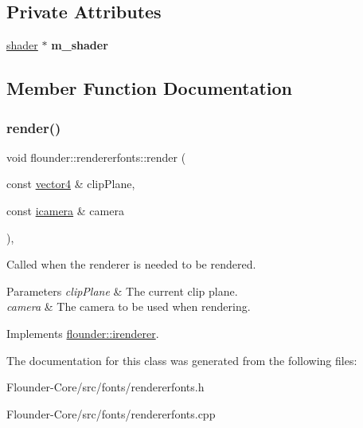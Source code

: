 \subsection*{Private Attributes}
\begin{DoxyCompactItemize}
\item 
\mbox{\label{classflounder_1_1rendererfonts_a3fd94919ff2c493737089b6cd6d80884}} 
\hyperlink{classflounder_1_1shader}{shader} $\ast$ {\bfseries m\+\_\+shader}
\end{DoxyCompactItemize}


\subsection{Member Function Documentation}
\mbox{\label{classflounder_1_1rendererfonts_a7702e992c6546d06019ce2ef1bf68c33}} 
\subsubsection{\texorpdfstring{render()}{render()}}
{\footnotesize\ttfamily void flounder\+::rendererfonts\+::render (\begin{DoxyParamCaption}\item[{const \hyperlink{classflounder_1_1vector4}{vector4} \&}]{clip\+Plane,  }\item[{const \hyperlink{classflounder_1_1icamera}{icamera} \&}]{camera }\end{DoxyParamCaption})\hspace{0.3cm}{\ttfamily [override]}, {\ttfamily [virtual]}}



Called when the renderer is needed to be rendered. 


\begin{DoxyParams}{Parameters}
{\em clip\+Plane} & The current clip plane. \\
\hline
{\em camera} & The camera to be used when rendering. \\
\hline
\end{DoxyParams}


Implements \hyperlink{classflounder_1_1irenderer_a3f355dc39e2680bf3f3441d3dfaaa010}{flounder\+::irenderer}.



The documentation for this class was generated from the following files\+:\begin{DoxyCompactItemize}
\item 
Flounder-\/\+Core/src/fonts/rendererfonts.\+h\item 
Flounder-\/\+Core/src/fonts/rendererfonts.\+cpp\end{DoxyCompactItemize}
